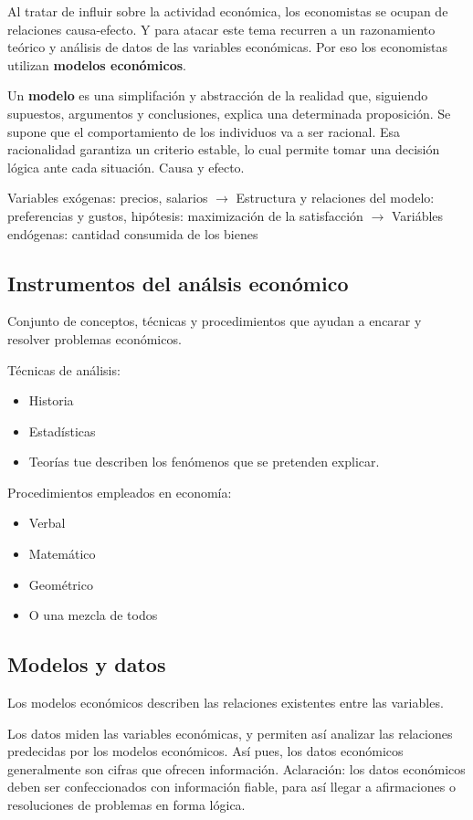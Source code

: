 Al tratar de influir sobre la actividad económica,
los economistas se ocupan de relaciones causa-efecto.
Y para atacar este tema recurren a un razonamiento teórico
y análisis de datos de las variables económicas.
Por eso los economistas utilizan \textbf{modelos económicos}.

Un \textbf{modelo} es una simplifación y abstracción de la realidad que,
siguiendo supuestos, argumentos y conclusiones,
explica una determinada proposición.
Se supone que el comportamiento de los individuos va a ser racional.
Esa racionalidad garantiza un criterio estable,
lo cual permite tomar una decisión lógica ante cada situación.
Causa y efecto.

Variables exógenas: precios, salarios \(\to\) Estructura y relaciones del modelo: preferencias y gustos, hipótesis: maximización de la satisfacción \(\to\) Variábles endógenas: cantidad consumida de los bienes

\subsection{Instrumentos del análsis económico}

Conjunto de conceptos, técnicas y procedimientos que ayudan a encarar y resolver problemas económicos.

Técnicas de análisis:
\begin{itemize}
    \item Historia
    \item Estadísticas
    \item Teorías tue describen los fenómenos que se pretenden explicar.
\end{itemize}

Procedimientos empleados en economía:
\begin{itemize}
    \item Verbal
    \item Matemático
    \item Geométrico
    \item O una mezcla de todos
\end{itemize}

\subsection{Modelos y datos}

Los modelos económicos describen las relaciones existentes entre las variables.

Los datos miden las variables económicas,
y permiten así analizar las relaciones predecidas por los modelos económicos.
Así pues,
los datos económicos generalmente son cifras que ofrecen información.
Aclaración: los datos económicos deben ser confeccionados con información fiable,
para así llegar a afirmaciones o resoluciones de problemas en forma lógica.

